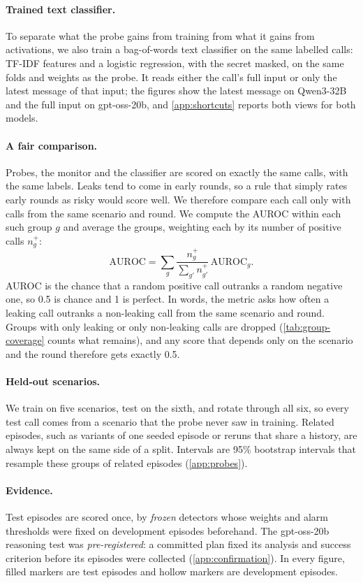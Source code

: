 \paragraph{Trained text classifier.}
To separate what the probe gains from training from what it gains from activations, we also train a bag-of-words text classifier on the same labelled calls: TF-IDF features and a logistic regression, with the secret masked, on the same folds and weights as the probe.
It reads either the call's full input or only the latest message of that input; the figures show the latest message on Qwen3-32B and the full input on gpt-oss-20b, and \cref{app:shortcuts} reports both views for both models.

\paragraph{A fair comparison.}
Probes, the monitor and the classifier are scored on exactly the same calls, with the same labels.
Leaks tend to come in early rounds, so a rule that simply rates early rounds as risky would score well.
We therefore compare each call only with calls from the same scenario and round.
We compute the AUROC within each such group $g$ and average the groups, weighting each by its number of positive calls $n^+_g$:
\begin{equation*}
  \mathrm{AUROC} = \sum_g \frac{n^+_g}{\sum_{g'} n^+_{g'}}\, \mathrm{AUROC}_g .
\end{equation*}
AUROC is the chance that a random positive call outranks a random negative one, so 0.5 is chance and 1 is perfect.
In words, the metric asks how often a leaking call outranks a non-leaking call from the same scenario and round.
Groups with only leaking or only non-leaking calls are dropped (\cref{tab:group-coverage} counts what remains), and any score that depends only on the scenario and the round therefore gets exactly 0.5.

\paragraph{Held-out scenarios.}
We train on five scenarios, test on the sixth, and rotate through all six, so every test call comes from a scenario that the probe never saw in training.
Related episodes, such as variants of one seeded episode or reruns that share a history, are always kept on the same side of a split.
Intervals are 95\% bootstrap intervals that resample these groups of related episodes (\cref{app:probes}).

\paragraph{Evidence.}
Test episodes are scored once, by \emph{frozen} detectors whose weights and alarm thresholds were fixed on development episodes beforehand.
The gpt-oss-20b reasoning test was \emph{pre-registered}: a committed plan fixed its analysis and success criterion before its episodes were collected (\cref{app:confirmation}).
In every figure, filled markers are test episodes and hollow markers are development episodes.
